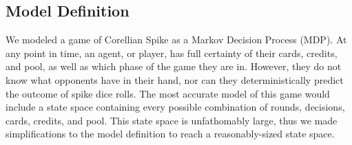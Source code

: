 \documentclass{article}
\begin{document}

\subsection{Model Definition} %
We modeled a game of Corellian Spike as a Markov Decision Process (MDP). At any point in time, an agent, or player, has full certainty of their cards, credits, and pool, as well as which phase of the game they are in. However, they do not know what opponents have in their hand, nor can they deterministically predict the outcome of spike dice rolls. The most accurate model of this game would include a state space containing every possible combination of rounds, decisions, cards, credits, and pool. This state space is unfathomably large, thus we made simplifications to the model definition to reach a reasonably-sized state space.
\end{document}
